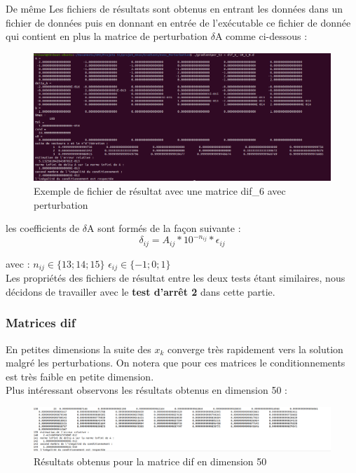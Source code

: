 \documentclass[12,french]{report}
\begin{document}
De même Les fichiers de résultats sont obtenus en entrant les données dans un fichier de données puis en donnant en entrée de l’exécutable ce fichier de donnée qui contient en plus la matrice de perturbation $\delta$A comme ci-dessous :
\begin{figure}[H]
	\centering
	\includegraphics[width=1\textwidth]{./Images/dif_6_1.res}
	\caption{Exemple de fichier de résultat avec une matrice dif\_6 avec perturbation}
\end{figure}

les coefficients de $\delta$A sont formés de la façon suivante :
\[
\delta_{ij}=A_{ij}*10^{-n_{ij}}*\epsilon_{ij}
\]

avec : $n_{ij}\in\{13;14;15\}$ $\epsilon_{ij}\in\{-1;0;1\}$\\
Les propriétés des fichiers de résultat entre les deux tests étant similaires, nous décidons de travailler avec le \textbf{test d'arrêt 2} dans cette partie.

\subsubsection{Matrices dif}
En petites dimensions la suite des $x_{k}$
converge très rapidement vers la solution malgré les perturbations. On notera que pour ces matrices le conditionnements est très faible en petite dimension.\\
Plus intéressant observons les résultats obtenus en dimension 50 :\\

\begin{figure}[H]
	\centering
	\includegraphics[width=1.23\textwidth]{./Images/dif_50_1.res}
	\caption{Résultats obtenus pour la matrice dif en dimension 50}
\end{figure}
\end{document}
